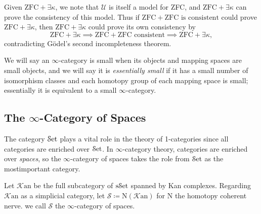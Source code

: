 Given $\mathrm{ZFC} +\exists \kappa $, we note that $\mathcal{U} $ is itself a model for ZFC, and $\mathrm{ZFC} +\exists \kappa $ can prove the consistency of this model. Thus if $\mathrm{ZFC} +\text{ZFC is consistent} $ could prove $\mathrm{ZFC} +\exists \kappa $, then $\mathrm{ZFC} +\exists \kappa $ could prove its own consistency by
\[
	\mathrm{ZFC} +\exists \kappa \implies \text{ZFC} +\text{ZFC consistent} \implies \mathrm{ZFC} +\exists \kappa ,
\]
contradicting G\"odel's second incompleteness theorem.

We will say an $\infty $-category is small when its objects and mapping spaces are small objects, and we will say it is \emph{essentially small} if it has a small number of isomorphism classes and each homotopy group of each mapping space is small; essentially it is equivalent to a small $\infty $-category.

\subsection{The $\infty $-Category of Spaces}

The category $\mathcal{S}\mathrm{et} $ plays a vital role in the theory of 1-categories since all categories are enriched over $\mathcal{S}\mathrm{et} $. In $\infty $-category theory, categories are enriched over \emph{spaces}, so the $\infty $-category of spaces takes the role from $\mathcal{S}\mathrm{et} $ as the mostimportant category.

\begin{definition}\label{1.2.16.1}
	Let $\mathcal{K} \mathrm{an} $ be the full subcategory of $\mathrm{s}\mathcal{S}\mathrm{et} $ spanned by Kan complexes. Regarding $\mathcal{K} \mathrm{an} $ as a simplicial category, let $\mathcal{S} \coloneqq \mathrm{N}(\mathcal{K} \mathrm{an} )$ for $\mathrm{N} $ the homotopy coherent nerve. we call $\mathcal{S} $ the $\infty $-category of spaces.
\end{definition}

